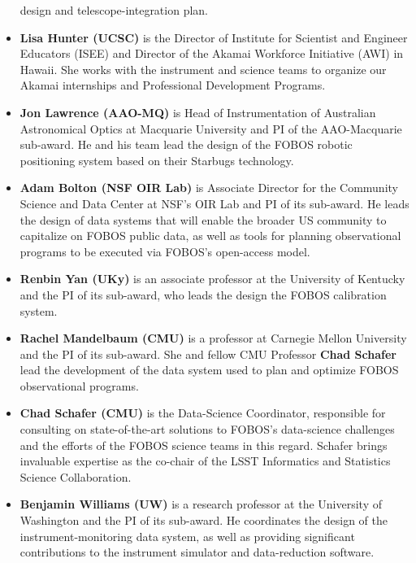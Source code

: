\documentclass[oneside,11pt]{amsart}
\begin{document}
\begin{itemize}
design and telescope-integration plan.\\[-5pt]
%
\item {\bf Lisa Hunter (UCSC)} is the Director of Institute for
Scientist and Engineer Educators (ISEE) and Director of the Akamai
Workforce Initiative (AWI) in Hawaii. She works with the instrument
and science teams to organize our Akamai internships and Professional
Development Programs.\\[-5pt]
%
\item {\bf Jon Lawrence (AAO-MQ)} is Head of Instrumentation of
Australian Astronomical Optics at Macquarie University and PI of the
AAO-Macquarie sub-award.  He and his team lead the design of the FOBOS
robotic positioning system based on their Starbugs
technology.\\[-5pt]
%
\item {\bf Adam Bolton (NSF OIR Lab)} is Associate Director for the
Community Science and Data Center at NSF's OIR Lab and PI of its
sub-award. He leads the design of data systems that will enable
the broader US community to capitalize on FOBOS public data, as well
as tools for planning observational programs to be executed via
FOBOS's open-access model.\\[-5pt]
%
\item {\bf Renbin Yan (UKy)} is an associate professor at the
University of Kentucky and the PI of its sub-award, who leads the
design the FOBOS calibration system.\\[-5pt]
%
\item {\bf Rachel Mandelbaum (CMU)} is a professor at Carnegie Mellon
University and the PI of its sub-award. She and fellow CMU Professor
{\bf Chad Schafer} lead the development of the data system used to
plan and optimize FOBOS observational programs.\\[-5pt]
%
\item {\bf Chad Schafer (CMU)} is the Data-Science Coordinator,
responsible for consulting on state-of-the-art solutions to FOBOS’s
data-science challenges and the efforts of the FOBOS science teams in
this regard. Schafer brings invaluable expertise as the co-chair of the
LSST Informatics and Statistics Science Collaboration.\\[-5pt]
%
\item {\bf Benjamin Williams (UW)} is a research professor at the
University of Washington and the PI of its sub-award. He coordinates
the design of the instrument-monitoring data system, as well as
providing significant contributions to the instrument simulator and
data-reduction software.
%
\end{itemize}
\end{document}
